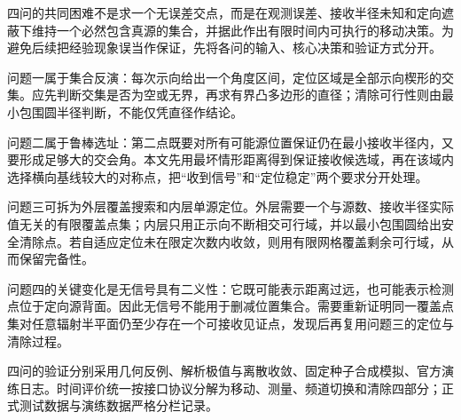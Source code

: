 四问的共同困难不是求一个无误差交点，而是在观测误差、接收半径未知和定向遮蔽下维持一个必然包含真源的集合，并据此作出有限时间内可执行的移动决策。为避免后续把经验现象误当作保证，先将各问的输入、核心决策和验证方式分开。

问题一属于集合反演：每次示向给出一个角度区间，定位区域是全部示向楔形的交集。应先判断交集是否为空或无界，再求有界凸多边形的直径；清除可行性则由最小包围圆半径判断，不能仅凭直径作结论。

问题二属于鲁棒选址：第二点既要对所有可能源位置保证仍在最小接收半径内，又要形成足够大的交会角。本文先用最坏情形距离得到保证接收候选域，再在该域内选择横向基线较大的对称点，把“收到信号”和“定位稳定”两个要求分开处理。

问题三可拆为外层覆盖搜索和内层单源定位。外层需要一个与源数、接收半径实际值无关的有限覆盖点集；内层只用正示向不断相交可行域，并以最小包围圆给出安全清除点。若自适应定位未在限定次数内收敛，则用有限网格覆盖剩余可行域，从而保留完备性。

问题四的关键变化是无信号具有二义性：它既可能表示距离过远，也可能表示检测点位于定向源背面。因此无信号不能用于删减位置集合。需要重新证明同一覆盖点集对任意辐射半平面仍至少存在一个可接收见证点，发现后再复用问题三的定位与清除过程。

四问的验证分别采用几何反例、解析极值与离散收敛、固定种子合成模拟、官方演练日志。时间评价统一按接口协议分解为移动、测量、频道切换和清除四部分；正式测试数据与演练数据严格分栏记录。

